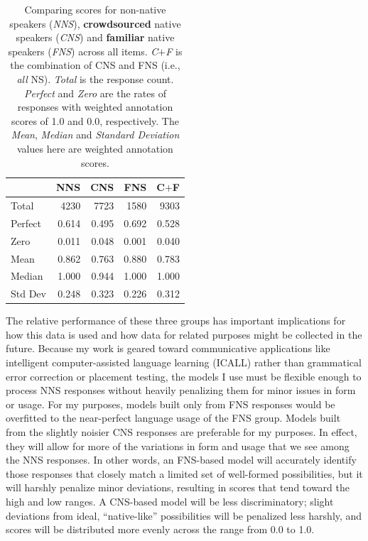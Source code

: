\begin{table}[htb!]
\begin{center}
\begin{tabular}{|l||r||r|r||r|}
\hline
 & NNS	& CNS & FNS & C$+$F \\
\hline
\hline
Total & 4230 & 7723 & 1580 & 9303 \\
\hline
\hline
Perfect & 0.614 & 0.495 & 0.692 & 0.528 \\
\hline
Zero & 0.011 & 0.048 & 0.001 & 0.040 \\
\hline
\hline
Mean & 0.862 & 0.763 & 0.880 & 0.783 \\
\hline
Median & 1.000 & 0.944 & 1.000 & 1.000 \\
\hline
Std Dev & 0.248 & 0.323 & 0.226 & 0.312 \\
\hline
\end{tabular}
\caption{\label{tab:was1} Comparing scores for non-native speakers (\textit{NNS}), \textbf{crowdsourced} native speakers (\textit{CNS}) and \textbf{familiar} native speakers (\textit{FNS}) across all items. \textit{C$+$F} is the combination of CNS and FNS (i.e., \textit{all} NS). \textit{Total} is the response count. \textit{Perfect} and \textit{Zero} are the rates of responses with weighted annotation scores of 1.0 and 0.0, respectively. The \textit{Mean}, \textit{Median} and \textit{Standard Deviation} values here are weighted annotation scores.}
\end{center}
\end{table}

The relative performance of these three groups has important implications for how this data is used and how data for related purposes might be collected in the future. Because my work is geared toward communicative applications like intelligent computer-assisted language learning (ICALL) rather than grammatical error correction or placement testing, the models I use must be flexible enough to process NNS responses without heavily penalizing them for minor issues in form or usage. For my purposes, models built only from FNS responses would be overfitted to the near-perfect language usage of the FNS group. Models built from the slightly noisier CNS responses are preferable for my purposes. In effect, they will allow for more of the variations in form and usage that we see among the NNS responses. In other words, an FNS-based model will accurately identify those responses that closely match a limited set of well-formed possibilities, but it will harshly penalize minor deviations, resulting in scores that tend toward the high and low ranges. A CNS-based model will be less discriminatory; slight deviations from ideal, ``native-like'' possibilities will be penalized less harshly, and scores will be distributed more evenly across the range from 0.0 to 1.0.

